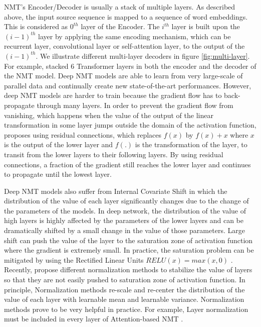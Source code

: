 NMT's Encoder/Decoder is usually a stack of multiple layers. As described above, the input source sequence is mapped to a sequence of word embeddings. This is considered as $0^{th}$ layer of the Encoder. The $i^{th}$ layer is built upon the $(i-1)^{th}$ layer by applying the same encoding mechanism, which can be recurrent layer, convolutional layer or self-attention layer, to the output of the $(i-1)^{th}$. We illustrate different multi-layer decoders in figure \ref{fig:multi-layer}. For example, \citet{Vaswani17attention} stacked 6 Transformer layers in both the encoder and the decoder of the NMT model. Deep NMT models are able to learn from very large-scale of parallel data \citep{Ott18scaling} and continually create new state-of-the-art performances. However, deep NMT models are harder to train because the gradient flow has to back-propagate through many layers. In order to prevent the gradient flow from vanishing, which happens when the value of the output of the linear transformation in some layer jumps outside the domain of the activation function, \citep{He16deep} proposes using residual connections, which replaces $f(x)$ by $f(x)+x$ where $x$ is the output of the lower layer and $f(.)$ is the transformation of the layer, to transit from the lower layers to their following layers. By using residual connections, a fraction of the gradient still reaches the lower layer and continues to propagate until the lowest layer.

Deep NMT models also suffer from Internal Covariate Shift in which the distribution of the value of each layer significantly changes due to the change of the parameters of the models. In deep network, the distribution of the value of high layers is highly affected by the parameters of the lower layers and can be dramatically shifted by a small change in the value of those parameters. Large shift can push the value of the layer to the saturation zone of activation function where the gradient is extremely small. In practice, the saturation problem can be mitigated by using the Rectified Linear Units $RELU(x) = max(x,0)$ \citep{Nair10rectified}. Recently, \citep{Ioffe15batch,Jimmy16layer} propose different normalization methods to stabilize the value of layers so that they are not easily pushed to saturation zone of activation function. In principle, Normalization methods re-scale and re-center the distribution of the value of each layer with learnable mean and learnable variance. Normalization methods prove to be very helpful in practice. For example, Layer normalization must be included in every layer of Attention-based NMT \citep{Vaswani17attention}.

